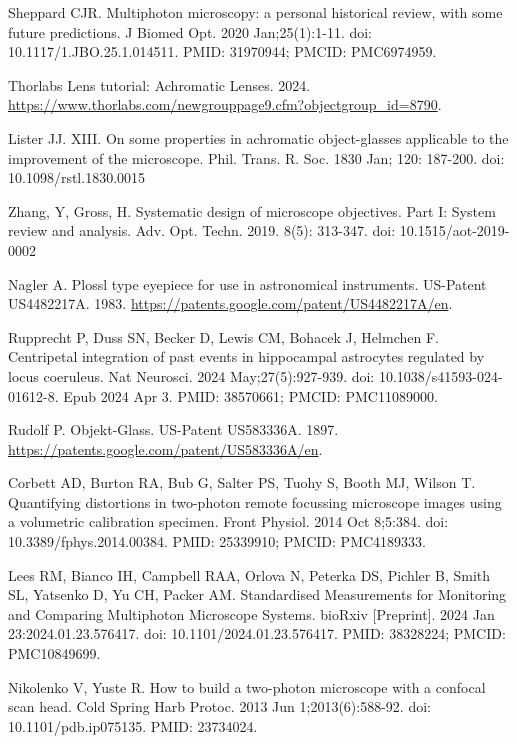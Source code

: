 \documentclass[10pt,letterpaper]{article}
\begin{document}
\begin{thebibliography}{10}
Sheppard CJR. Multiphoton microscopy: a personal historical review, with some future predictions. J Biomed Opt. 2020 Jan;25(1):1-11. doi: 10.1117/1.JBO.25.1.014511. PMID: 31970944; PMCID: PMC6974959.

Thorlabs Lens tutorial: Achromatic Lenses. 2024. \url{https://www.thorlabs.com/newgrouppage9.cfm?objectgroup_id=8790}.

Lister JJ. XIII. On some properties in achromatic object-glasses applicable to the improvement of the microscope. Phil. Trans. R. Soc. 1830 Jan; 120: 187-200. doi: 10.1098/rstl.1830.0015

Zhang, Y, Gross, H. Systematic design of microscope objectives. Part I: System review and analysis. Adv. Opt. Techn. 2019. 8(5): 313-347. doi: 10.1515/aot-2019-0002

Nagler A. Plossl type eyepiece for use in astronomical instruments. US-Patent US4482217A. 1983.
\url{https://patents.google.com/patent/US4482217A/en}.

Rupprecht P, Duss SN, Becker D, Lewis CM, Bohacek J, Helmchen F. Centripetal integration of past events in hippocampal astrocytes regulated by locus coeruleus. Nat Neurosci. 2024 May;27(5):927-939. doi: 10.1038/s41593-024-01612-8. Epub 2024 Apr 3. PMID: 38570661; PMCID: PMC11089000.

Rudolf P. Objekt-Glass. US-Patent US583336A. 1897. \url{https://patents.google.com/patent/US583336A/en}.

Corbett AD, Burton RA, Bub G, Salter PS, Tuohy S, Booth MJ, Wilson T. Quantifying distortions in two-photon remote focussing microscope images using a volumetric calibration specimen. Front Physiol. 2014 Oct 8;5:384. doi: 10.3389/fphys.2014.00384. PMID: 25339910; PMCID: PMC4189333.

Lees RM, Bianco IH, Campbell RAA, Orlova N, Peterka DS, Pichler B, Smith SL, Yatsenko D, Yu CH, Packer AM. Standardised Measurements for Monitoring and Comparing Multiphoton Microscope Systems. bioRxiv [Preprint]. 2024 Jan 23:2024.01.23.576417. doi: 10.1101/2024.01.23.576417. PMID: 38328224; PMCID: PMC10849699.

Nikolenko V, Yuste R. How to build a two-photon microscope with a confocal scan head. Cold Spring Harb Protoc. 2013 Jun 1;2013(6):588-92. doi: 10.1101/pdb.ip075135. PMID: 23734024.


\end{thebibliography}
\end{document}
